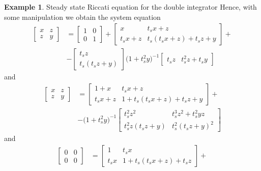 \documentclass[11pt,a4paper,oneside]{book}
\numberwithin{equation}{section}
\theoremstyle{it}
\theoremstyle{definition}
\newtheorem{example}{Example}[chapter]
\begin{document}
\begin{example}{Steady state Riccati equation for the double integrator}
Hence, with some manipulation we obtain the system equation
\begin{equation}\label{example_riccati_eq5}
	\begin{aligned}
		\begin{bmatrix}x&z\\z&y\end{bmatrix} &=\begin{bmatrix}1&0\\0&1\end{bmatrix} + 
		\begin{bmatrix}x&t_sx+z\\t_sx+z&t_s(t_sx+z)+t_sz+y\end{bmatrix} + \\[6pt]
		&-\begin{bmatrix}t_sz\\t_s(t_sz+y)\end{bmatrix} \Big(1+t_s^2y\Big)^{-1}\begin{bmatrix} t_sz& t_s^2z+t_sy\end{bmatrix}
	\end{aligned}
\end{equation}
and
\begin{equation}\label{example_riccati_eq6}
	\begin{aligned}
		\begin{bmatrix}x&z\\z&y\end{bmatrix} &= \begin{bmatrix}1+x&t_sx+z\\t_sx+z&1+t_s(t_sx+z)+t_sz+y\end{bmatrix} + \\[6pt]
		&-\Big(1+t_s^2y\Big)^{-1}\begin{bmatrix}t_s^2z^2 & t_s^3z^2+t_s^2yz \\ t_s^2z(t_sz+y) & t_s^2(t_sz+y)^2\end{bmatrix}
	\end{aligned}
\end{equation}
and 
\begin{equation}\label{example_riccati_eq7}
	\begin{aligned}
		\begin{bmatrix}0&0\\0&0\end{bmatrix} &= \begin{bmatrix}1&t_sx\\t_sx&1+t_s(t_sx+z)+t_sz\end{bmatrix} + \\[6pt]

\end{aligned}
\end{equation}
\end{example}
\end{document}
